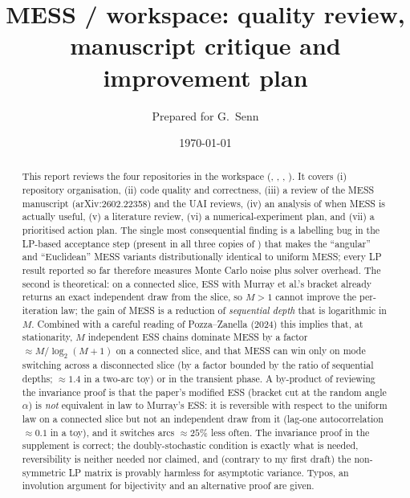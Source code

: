 \documentclass[11pt,a4paper]{article}
\title{MESS / \code{mcmc} workspace: quality review, manuscript critique and improvement plan}
\author{Prepared for G.~Senn}
\date{\today}
\theoremstyle{remark}
\begin{document}
\maketitle

\begin{abstract}
\noindent This report reviews the four repositories in the  workspace (, , , ). It covers (i) repository organisation, (ii) code quality and correctness, (iii) a review of the MESS manuscript (arXiv:2602.22358) and the UAI reviews, (iv) an analysis of when MESS is actually useful, (v) a literature review, (vi) a numerical-experiment plan, and (vii) a prioritised action plan. The single most consequential finding is a labelling bug in the LP-based acceptance step (present in all three copies of ) that makes the ``angular'' and ``Euclidean'' MESS variants distributionally identical to uniform MESS; every LP result reported so far therefore measures Monte Carlo noise plus solver overhead. The second is theoretical: on a connected slice, ESS with Murray et al.'s bracket already returns an exact independent draw from the slice, so $M>1$ cannot improve the per-iteration law; the gain of MESS is a reduction of \emph{sequential depth} that is logarithmic in $M$. Combined with a careful reading of Pozza--Zanella (2024) this implies that, at stationarity, $M$ independent ESS chains dominate MESS by a factor $\approx M/\log_2(M+1)$ on a connected slice, and that MESS can win only on mode switching across a disconnected slice (by a factor bounded by the ratio of sequential depths; $\approx1.4$ in a two-arc toy) or in the transient phase. A by-product of reviewing the invariance proof is that the paper's modified ESS (bracket cut at the random angle $\alpha$) is \emph{not} equivalent in law to Murray's ESS: it is reversible with respect to the uniform law on a connected slice but not an independent draw from it (lag-one autocorrelation $\approx0.1$ in a toy), and it switches arcs $\approx25\%$ less often. The invariance proof in the supplement is correct; the doubly-stochastic condition is exactly what is needed, reversibility is neither needed nor claimed, and (contrary to my first draft) the non-symmetric LP matrix is provably harmless for asymptotic variance. Typos, an involution argument for bijectivity and an alternative proof are given.
\end{abstract}

\tableofcontents

\end{document}

